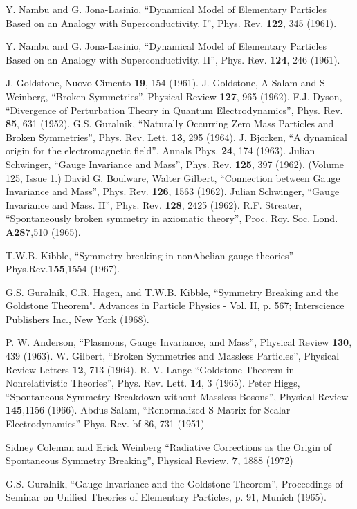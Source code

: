 \documentclass[preprintnumbers,12pt]{revtex4-2}
\begin{document}
\begin{thebibliography}{99}
 Y. Nambu and G. Jona-Lasinio, ``Dynamical Model of
  Elementary Particles Based on an Analogy with Superconductivity. I'',
  Phys. Rev. {\bf 122}, 345 (1961).

 Y. Nambu and G. Jona-Lasinio, ``Dynamical Model of
  Elementary Particles Based on an Analogy with Superconductivity. II'',
  Phys. Rev. {\bf 124}, 246 (1961).

 J. Goldstone, Nuovo Cimento {\bf 19}, 154 (1961).
 J. Goldstone, A Salam and S Weinberg, ``Broken
  Symmetries''. Physical Review {\bf 127}, 965 (1962).
 F.J. Dyson, ``Divergence of Perturbation Theory in Quantum
  Electrodynamics'', Phys. Rev. {\bf 85}, 631 (1952).
 G.S. Guralnik, ``Naturally Occurring Zero Mass Particles and Broken
Symmetries'',  Phys. Rev. Lett. {\bf 13}, 295 (1964).
 J. Bjorken, ``A dynamical origin for the electromagnetic field'',
  Annals Phys. {\bf 24}, 174 (1963).
 Julian Schwinger, ``Gauge Invariance and Mass'',
  Phys. Rev. {\bf 125}, 397 (1962). (Volume 125, Issue 1.)
 David G. Boulware, Walter Gilbert, ``Connection between Gauge
  Invariance and Mass'', Phys. Rev. {\bf 126}, 1563 (1962).
 Julian Schwinger, ``Gauge Invariance and Mass. II'',
  Phys. Rev. {\bf 128}, 2425 (1962).
 R.F. Streater, ``Spontaneously broken symmetry in axiomatic
  theory'', Proc. Roy. Soc. Lond. {\bf A287},510 (1965).

 T.W.B. Kibble, ``Symmetry breaking in nonAbelian gauge theories''
Phys.Rev.{\bf155},1554 (1967).

 G.S. Guralnik, C.R. Hagen, and T.W.B. Kibble, ``Symmetry
  Breaking and the Goldstone Theorem".
  {Advances in Particle Physics - Vol. II}, p. 567; Interscience
  Publishers Inc., New York (1968).

 P. W. Anderson, ``Plasmons, Gauge Invariance, and Mass'',
  Physical Review {\bf 130}, 439 (1963).
 W. Gilbert, ``Broken Symmetries and Massless Particles'',
  Physical Review Letters {\bf 12}, 713 (1964).
 R. V. Lange ``Goldstone Theorem in Nonrelativistic
  Theories'', Phys. Rev. Lett. {\bf 14}, 3 (1965).
 Peter Higgs, ``Spontaneous Symmetry Breakdown without
  Massless Bosons'', Physical Review {\bf  145},1156 (1966).
 Abdus Salam, ``Renormalized S-Matrix for Scalar Electrodynamics'' Phys. Rev. {bf 86}, 731 (1951)

 Sidney Coleman and Erick Weinberg ``Radiative
  Corrections as the Origin of Spontaneous Symmetry Breaking'',
  Physical Review. {\bf 7}, 1888 (1972)

 G.S. Guralnik, ``Gauge Invariance and the Goldstone Theorem'',
  Proceedings of Seminar on Unified Theories of Elementary Particles, p. 91,
  Munich (1965).




\end{thebibliography}
\end{document}
